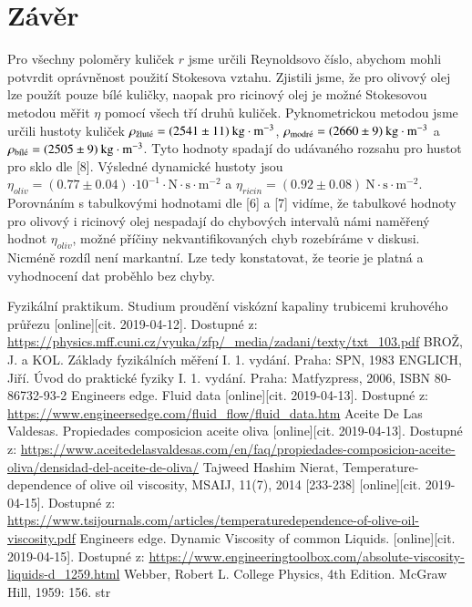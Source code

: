 \documentclass[a4paper]{article}
\begin{document}
\section*{Závěr}
\par Pro všechny poloměry kuliček $r$ jsme určili Reynoldsovo číslo, abychom mohli potvrdit oprávněnost použití Stokesova vztahu. Zjistili jsme, že pro olivový olej lze použít pouze bílé kuličky, naopak pro ricinový olej je možné Stokesovou metodou měřit $\eta$ pomocí všech tří druhů kuliček. Pyknometrickou metodou jsme určili hustoty kuliček $\rho_{\textnormal{žluté}} = (2541\pm11) \: \mathrm{kg \cdot m^{-3}}$, $\rho_{\textnormal{modré}} = (2660\pm9) \: \mathrm{kg \cdot m^{-3}}$ a $\rho_{\textnormal{bílé}} = (2505\pm9) \: \mathrm{kg \cdot m^{-3}}$. Tyto hodnoty spadají do udávaného rozsahu pro hustot pro sklo dle [8]. Výsledné dynamické hustoty jsou $\eta_{oliv} = (0.77\pm0.04)  \: \mathrm{\cdot 10^{-1} \cdot N \cdot s \cdot m^{-2}}$ a $\eta_{ricin} = (0.92\pm0.08)  \: \mathrm{N \cdot s \cdot m^{-2}}$. Porovnáním s tabulkovými hodnotami dle [6] a [7] vidíme, že tabulkové hodnoty pro olivový i ricinový olej nespadají do chybových intervalů námi naměřený hodnot $\eta_{oliv}$, možné příčiny nekvantifikovaných chyb rozebíráme v diskusi. Nicméně rozdíl není markantní. Lze tedy konstatovat, že teorie je platná a vyhodnocení dat proběhlo bez chyby.
\renewcommand\refname{Použitá literatura}
\begin{thebibliography}{}
Fyzikální praktikum. Studium proudění viskózní kapaliny trubicemi kruhového
průřezu [online][cit. 2019-04-12]. Dostupné z:
\url{https://physics.mff.cuni.cz/vyuka/zfp/_media/zadani/texty/txt_103.pdf}
BROŽ, J. a KOL. Základy fyzikálních měření I. 1. vydání. Praha: SPN, 1983
ENGLICH, Jiří. Úvod do praktické fyziky I. 1. vydání. Praha: Matfyzpress, 2006, ISBN 80-86732-93-2
Engineers edge. Fluid data [online][cit. 2019-04-13]. Dostupné z:
\url{https://www.engineersedge.com/fluid_flow/fluid_data.htm}
Aceite De Las Valdesas. Propiedades composicion aceite oliva [online][cit. 2019-04-13]. Dostupné z:
\url{https://www.aceitedelasvaldesas.com/en/faq/propiedades-composicion-aceite-oliva/densidad-del-aceite-de-oliva/}
Tajweed Hashim Nierat, Temperature-dependence of olive oil viscosity, MSAIJ, 11(7), 2014 [233-238] [online][cit. 2019-04-15]. Dostupné z:
\url{https://www.tsijournals.com/articles/temperaturedependence-of-olive-oil-viscosity.pdf}
Engineers edge. Dynamic Viscosity of common Liquids. [online][cit. 2019-04-15]. Dostupné z:
\url{https://www.engineeringtoolbox.com/absolute-viscosity-liquids-d_1259.html}
Webber, Robert L. College Physics, 4th Edition. McGraw Hill, 1959: 156. str
\end{thebibliography}
\end{document}

